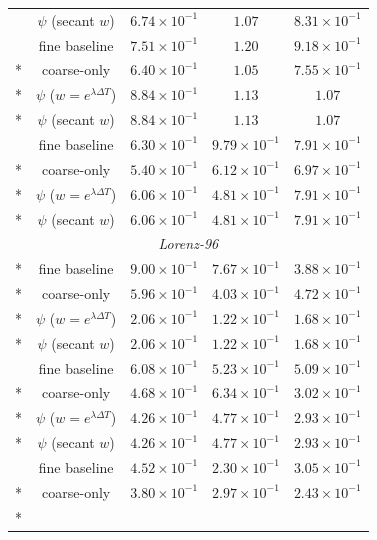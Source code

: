 \begin{longtable}{@{\extracolsep{\fill}}ccccc@{}}
 & $\psi$ (secant $w$) & $6.74\times 10^{-1}$ & $1.07$ & $8.31\times 10^{-1}$\\
\addlinespace[3pt]
\multirow{4}{*}{$64$} & fine baseline & $7.51\times 10^{-1}$ & $1.20$ & $9.18\times 10^{-1}$\\*
 & coarse-only & $6.40\times 10^{-1}$ & $1.05$ & $7.55\times 10^{-1}$\\*
 & $\psi$ ($w=e^{\lambda\Delta T}$) & $8.84\times 10^{-1}$ & $1.13$ & $1.07$\\*
 & $\psi$ (secant $w$) & $8.84\times 10^{-1}$ & $1.13$ & $1.07$\\
\addlinespace[3pt]
\multirow{4}{*}{$128$} & fine baseline & $6.30\times 10^{-1}$ & $9.79\times 10^{-1}$ & $7.91\times 10^{-1}$\\*
 & coarse-only & $5.40\times 10^{-1}$ & $6.12\times 10^{-1}$ & $6.97\times 10^{-1}$\\*
 & $\psi$ ($w=e^{\lambda\Delta T}$) & $6.06\times 10^{-1}$ & $4.81\times 10^{-1}$ & $7.91\times 10^{-1}$\\*
 & $\psi$ (secant $w$) & $6.06\times 10^{-1}$ & $4.81\times 10^{-1}$ & $7.91\times 10^{-1}$\\
\midrule
\multicolumn{5}{c}{\textit{Lorenz-96}}\\*
\multirow{4}{*}{$16$} & fine baseline & $9.00\times 10^{-1}$ & $7.67\times 10^{-1}$ & $3.88\times 10^{-1}$\\*
 & coarse-only & $5.96\times 10^{-1}$ & $4.03\times 10^{-1}$ & $4.72\times 10^{-1}$\\*
 & $\psi$ ($w=e^{\lambda\Delta T}$) & $2.06\times 10^{-1}$ & $1.22\times 10^{-1}$ & $1.68\times 10^{-1}$\\*
 & $\psi$ (secant $w$) & $2.06\times 10^{-1}$ & $1.22\times 10^{-1}$ & $1.68\times 10^{-1}$\\
\addlinespace[3pt]
\multirow{4}{*}{$32$} & fine baseline & $6.08\times 10^{-1}$ & $5.23\times 10^{-1}$ & $5.09\times 10^{-1}$\\*
 & coarse-only & $4.68\times 10^{-1}$ & $6.34\times 10^{-1}$ & $3.02\times 10^{-1}$\\*
 & $\psi$ ($w=e^{\lambda\Delta T}$) & $4.26\times 10^{-1}$ & $4.77\times 10^{-1}$ & $2.93\times 10^{-1}$\\*
 & $\psi$ (secant $w$) & $4.26\times 10^{-1}$ & $4.77\times 10^{-1}$ & $2.93\times 10^{-1}$\\
\addlinespace[3pt]
\multirow{4}{*}{$64$} & fine baseline & $4.52\times 10^{-1}$ & $2.30\times 10^{-1}$ & $3.05\times 10^{-1}$\\*
 & coarse-only & $3.80\times 10^{-1}$ & $2.97\times 10^{-1}$ & $2.43\times 10^{-1}$\\*

\end{longtable}
